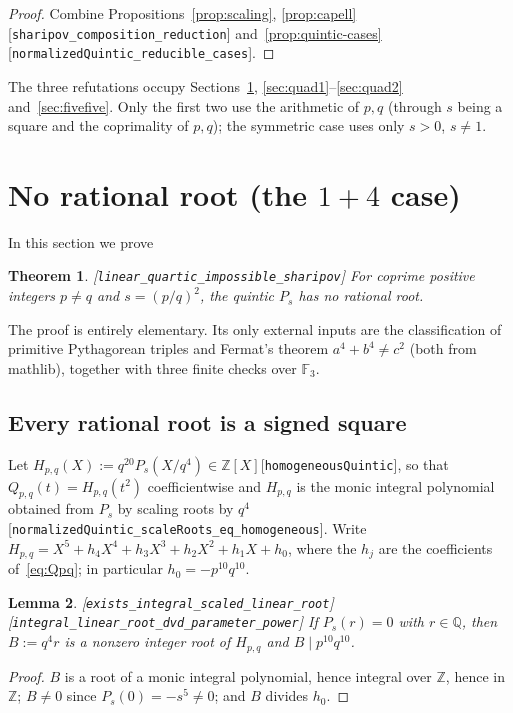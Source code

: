 \documentclass[10pt]{article}
\newtheorem{theorem}{Theorem}[section]
\newtheorem{lemma}[theorem]{Lemma}
\theoremstyle{definition}
\theoremstyle{remark}
\newcommand{\Q}{\mathbb{Q}}
\newcommand{\Z}{\mathbb{Z}}
\newcommand{\F}{\mathbb{F}}
\newcommand{\leanref}[1]{{\scriptsize\textup{[\texttt{#1}]}}\allowbreak}
\begin{document}
\begin{proof}
Combine Propositions~\ref{prop:scaling}, \ref{prop:capell}
\leanref{sharipov\_\allowbreak composition\_\allowbreak reduction} and~\ref{prop:quintic-cases}
\leanref{normalized\allowbreak Quintic\_\allowbreak reducible\_\allowbreak cases}.
\end{proof}

The three refutations occupy Sections~\ref{sec:linear}, \ref{sec:quad1}--\ref{sec:quad2}
and~\ref{sec:fivefive}.  Only the first two use the arithmetic of $p,q$
(through $s$ being a square and the coprimality of $p,q$); the symmetric case
uses only $s>0$, $s\ne1$.
\section{No rational root (the \texorpdfstring{$1+4$}{1+4} case)}\label{sec:linear}

In this section we prove
\begin{theorem}\label{thm:linear}
\leanref{linear\_\allowbreak quartic\_\allowbreak impossible\_\allowbreak sharipov}
For coprime positive integers $p\ne q$ and $s=(p/q)^2$, the quintic $P_s$ has
no rational root.
\end{theorem}
The proof is entirely elementary.  Its only external inputs are the
classification of primitive Pythagorean triples and Fermat's theorem
$a^4+b^4\ne c^2$ (both from mathlib), together with three finite checks over
$\F_3$.

\subsection{Every rational root is a signed square}\label{sec:newton}

Let $H_{p,q}(X):=q^{20}P_s(X/q^4)\in\Z[X]$\leanref{homogeneous\allowbreak Quintic}, so
that $Q_{p,q}(t)=H_{p,q}(t^2)$ coefficientwise and $H_{p,q}$ is the monic
integral polynomial obtained from $P_s$ by scaling roots by
$q^4$\leanref{normalized\allowbreak Quintic\_\allowbreak scale\allowbreak Roots\_\allowbreak eq\_\allowbreak homogeneous}.  Write
$H_{p,q}=X^5+h_4X^4+h_3X^3+h_2X^2+h_1X+h_0$, where the $h_j$ are the
coefficients of~\eqref{eq:Qpq}; in particular $h_0=-p^{10}q^{10}$.

\begin{lemma}\label{lem:integral-root}
\leanref{exists\_\allowbreak integral\_\allowbreak scaled\_\allowbreak linear\_\allowbreak root} \leanref{integral\_\allowbreak linear\_\allowbreak root\_\allowbreak dvd\_\allowbreak parameter\_\allowbreak power}
If $P_s(r)=0$ with $r\in\Q$, then $B:=q^4r$ is a nonzero integer root of
$H_{p,q}$ and $B\mid p^{10}q^{10}$.
\end{lemma}
\begin{proof}
$B$ is a root of a monic integral polynomial, hence integral over $\Z$, hence
in $\Z$; $B\ne0$ since $P_s(0)=-s^5\ne0$; and $B$ divides $h_0$.
\end{proof}
\end{document}
